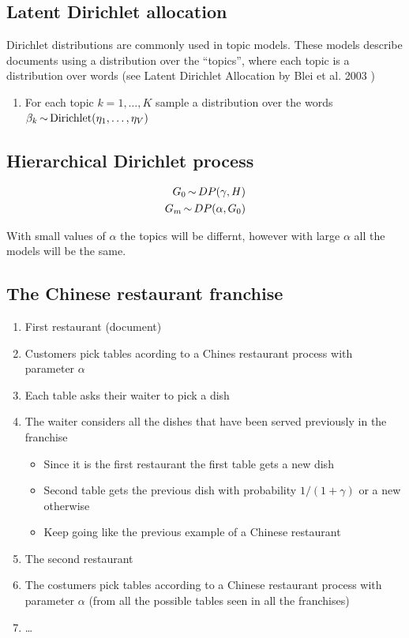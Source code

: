\documentclass[b5paper]{report}
\begin{document}
\subsection{Latent Dirichlet allocation}

Dirichlet distributions are commonly used in topic models. These models
describe documents using a distribution over the ``topics'', where each topic
is a distribution over words (see Latent Dirichlet Allocation by Blei et al.
2003 \cite{blei2003latent})

\begin{enumerate}
  \item For each topic $k = 1, \dots, K$ sample a distribution over the words
    $\beta_k \operatorname*{\sim} \text{Dirichlet}(\eta_1, \dots, \eta_V)$
\end{enumerate}

\subsection{Hierarchical Dirichlet process}

\begin{align}
  G_0 \operatorname*{\sim} DP(\gamma, H) \\
  G_m \operatorname*{\sim} DP(\alpha, G_0)
\end{align}

With small values of $\alpha$ the topics will be differnt, however with large
$\alpha$ all the models will be the same.

\subsection{The Chinese restaurant franchise}

\begin{enumerate}
  \item First restaurant (document)
    \item Customers pick tables acording to a Chines restaurant process with
      parameter $\alpha$
    \item Each table asks their waiter to pick a dish
    \item The waiter considers all the dishes that have been served previously
      in the franchise
\begin{itemize}
  \item Since it is the first restaurant the first table gets a new dish
  \item Second table gets the previous dish with probability $1/(1+\gamma)$ or
    a new otherwise
    \item Keep going like the previous example of a Chinese restaurant
\end{itemize}
  \item The second restaurant
  \item The costumers pick tables according to a Chinese restaurant process
    with parameter $\alpha$ (from all the possible tables seen in all the
    franchises)
  \item \dots
\end{enumerate}
\end{document}
